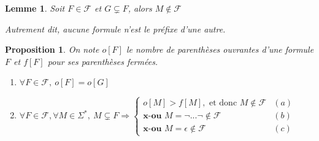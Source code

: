 \documentclass[]{article}
\newtheorem{myproposition}{Proposition}
\newtheorem{mylemma}{Lemme}
\theoremstyle{remark}
\theoremstyle{definition}
\begin{document}
\begin{mylemma}
	Soit $F \in \mathcal{F}$ et $G \subsetneq F$, alors $M \notin \mathcal{F}$
	
	Autrement dit, aucune formule n'est le préfixe d'une autre.
\end{mylemma}

\begin{myproposition}
	On note $o[F]$ le nombre de parenthèses ouvrantes d'une formule $F$ et $f[F]$ pour ses parenthèses fermées.
	\begin{enumerate}
			\item $\forall F \in \mathcal{F}, ~ o[F]=o[G]$
			\item $\forall F \in \mathcal{F}, \forall M \in \Sigma^*, ~ M \subsetneq F \Longrightarrow
			\left\{
			\begin{array}{ll}
				o[M] > f[M], \text{ et donc } M \notin \mathcal{F} & (a) \\
				\textbf{x-ou } M = \neg ... \neg \notin \mathcal{F} & (b)\\
				\textbf{x-ou } M = \epsilon \notin \mathcal{F} & (c)
			\end{array}
			\right.$
	\end{enumerate}
\end{myproposition}
\end{document}
